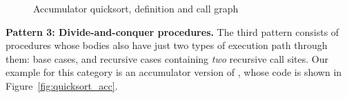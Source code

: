 \begin{figure}[tb]
\begin{center}
\begin{minipage}[b][1.9in]{0.49\textwidth}
\hfill
\end{minipage}
\begin{minipage}[b][1.9in]{0.49\textwidth}
\hfill
\end{minipage}
\end{center}
\vspace{-2ex}
\caption{Accumulator quicksort, definition and call graph}
\end{figure}

{\bf Pattern 3: Divide-and-conquer procedures.}
The third pattern consists of procedures whose bodies
also have just two types of execution path through them:
base cases, and recursive cases containing \emph{two} recursive call sites.
Our example for this category is an accumulator version of \quicksortacc,
whose code is shown in Figure~\ref{fig:quicksort_acc}.

